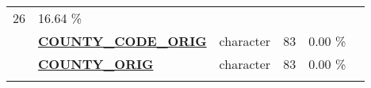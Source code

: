 \documentclass[]{article}
\begin{document}
\begin{longtable}[]{@{}lllrcl@{}}
\begin{minipage}[t]{0.11\columnwidth}
26\strut
\end{minipage} & \begin{minipage}[t]{0.10\columnwidth}\centering\strut
16.64 \%\strut
\end{minipage} & \begin{minipage}[t]{0.13\columnwidth}\raggedright\strut
\strut
\end{minipage}\tabularnewline
\begin{minipage}[t]{0.08\columnwidth}\raggedright\strut
\strut
\end{minipage} & \begin{minipage}[t]{0.28\columnwidth}\raggedright\strut
\textbf{\protect\hyperlink{county_code_orig}{COUNTY\_CODE\_ORIG}}\strut
\end{minipage} & \begin{minipage}[t]{0.12\columnwidth}\raggedright\strut
character\strut
\end{minipage} & \begin{minipage}[t]{0.11\columnwidth}\raggedleft\strut
83\strut
\end{minipage} & \begin{minipage}[t]{0.10\columnwidth}\centering\strut
0.00 \%\strut
\end{minipage} & \begin{minipage}[t]{0.13\columnwidth}\raggedright\strut
\strut
\end{minipage}\tabularnewline
\begin{minipage}[t]{0.08\columnwidth}\raggedright\strut
\strut
\end{minipage} & \begin{minipage}[t]{0.28\columnwidth}\raggedright\strut
\textbf{\protect\hyperlink{county_orig}{COUNTY\_ORIG}}\strut
\end{minipage} & \begin{minipage}[t]{0.12\columnwidth}\raggedright\strut
character\strut
\end{minipage} & \begin{minipage}[t]{0.11\columnwidth}\raggedleft\strut
83\strut
\end{minipage} & \begin{minipage}[t]{0.10\columnwidth}\centering\strut
0.00 \%\strut
\end{minipage} & \begin{minipage}[t]{0.13\columnwidth}\raggedright\strut
\strut
\end{minipage}\tabularnewline
\begin{minipage}[t]{0.08\columnwidth}\raggedright\strut
\strut

\end{minipage}
\end{longtable}
\end{document}

